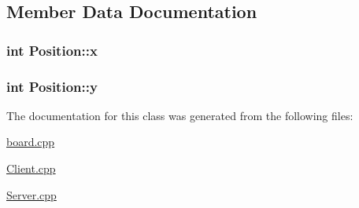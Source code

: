 \subsection{Member Data Documentation}
\hypertarget{classPosition_aeda152ffeee17ae5be9c02327b2408d8}{
\subsubsection[{x}]{\setlength{\rightskip}{0pt plus 5cm}int Position\-::x}}\label{classPosition_aeda152ffeee17ae5be9c02327b2408d8}
\hypertarget{classPosition_a3c08e9213d4726b21caba3073192c4a3}{
\subsubsection[{y}]{\setlength{\rightskip}{0pt plus 5cm}int Position\-::y}}\label{classPosition_a3c08e9213d4726b21caba3073192c4a3}


The documentation for this class was generated from the following files\-:\begin{DoxyCompactItemize}
\item 
\hyperlink{board_8cpp}{board.\-cpp}\item 
\hyperlink{Client_8cpp}{Client.\-cpp}\item 
\hyperlink{Server_8cpp}{Server.\-cpp}\end{DoxyCompactItemize}
